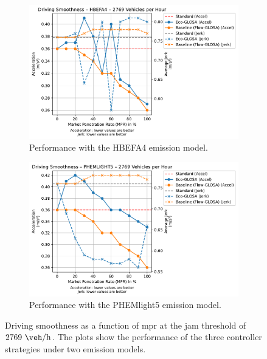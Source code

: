 \begin{figure}[htb]
  \centering
  \begin{subfigure}[b]{0.45\textwidth}
    \includegraphics[width=\textwidth]{data/img/DrivingSmoothness/DrivingSmoothness_HBEFA4_Cars2769.pdf}
    \caption{Performance with the HBEFA4 emission model.}
    \label{fig:Smoothness_HBEFA4_2769}
  \end{subfigure}\hfill
  \begin{subfigure}[b]{0.45\textwidth}
    \includegraphics[width=\textwidth]{data/img/DrivingSmoothness/DrivingSmoothness_PHEMLIGHT5_Cars2769.pdf}
    \caption{Performance with the PHEMlight5 emission model.}
    \label{fig:Smoothness_PHEMlight5_2769}
  \end{subfigure}
  \caption[Driving smoothness vs. \ac{mpr} at $2769~\unit{\veh\per\hour}$]{Driving smoothness as a function of \ac{mpr} at the jam threshold of $2769~\unit{\veh\per\hour}$. The plots show the performance of the three controller strategies under two emission models.}
  \label{fig:Smoothness_2769}
\end{figure}

